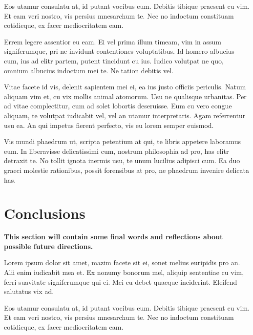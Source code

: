\documentclass[a4paper,11pt,oneside]{report}
\begin{document}
Eos utamur consulatu at, id putant vocibus eum. Debitis tibique praesent cu
vim. Et eam veri nostro, vis persius mnesarchum te. Nec no indoctum constituam
cotidieque, ex facer mediocritatem eam.

Errem legere assentior eu eam. Ei vel prima illum timeam, vim in assum
signiferumque, pri ne invidunt contentiones voluptatibus. Id homero albucius
cum, ius ad elitr partem, putent tincidunt cu ius. Iudico volutpat ne quo,
omnium albucius indoctum mei te. Ne tation debitis vel.

Vitae facete id vis, delenit sapientem mei ei, ea ius justo officiis
periculis. Natum aliquam vim et, cu vix mollis animal atomorum. Usu ne qualisque
urbanitas. Per ad vitae complectitur, cum ad solet lobortis deseruisse. Eum cu
vero congue aliquam, te volutpat iudicabit vel, vel an utamur
interpretaris. Agam referrentur usu ea. An qui impetus fierent perfecto, vis eu
lorem semper euismod.

Vis mundi phaedrum ut, scripta petentium at qui, te libris appetere laboramus
eum. In liberavisse delicatissimi cum, nostrum philosophia ad pro, has elitr
detraxit te. No tollit ignota inermis usu, te unum lucilius adipisci cum. Ea duo
graeci molestie rationibus, possit forensibus at pro, ne phaedrum invenire
delicata has.


\chapter{Conclusions}

\textbf{This section will contain some final words and reflections about
  possible future directions.}

Lorem ipsum dolor sit amet, mazim facete sit ei, sonet melius euripidis pro
an. Alii enim iudicabit mea et. Ex nonumy bonorum mel, aliquip sententiae cu
vim, ferri suavitate signiferumque qui ei. Mei cu debet quaeque
inciderint. Eleifend salutatus vix ad.

Eos utamur consulatu at, id putant vocibus eum. Debitis tibique praesent cu
vim. Et eam veri nostro, vis persius mnesarchum te. Nec no indoctum constituam
cotidieque, ex facer mediocritatem eam.
\end{document}
